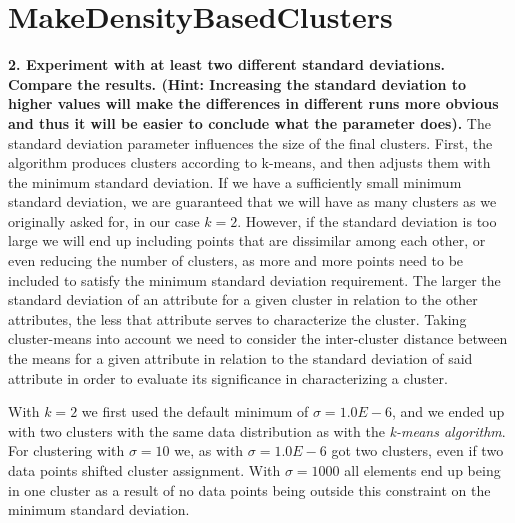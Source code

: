 \documentclass[]{article}
\begin{document}
\section{MakeDensityBasedClusters}
\textbf{2. Experiment with at least two different standard deviations. Compare the results. (Hint: Increasing the standard deviation to higher values will make the differences in different runs more obvious and thus it will be easier to conclude what the parameter does).} 
The standard deviation parameter influences the size of the final clusters. First, the algorithm produces clusters according to k-means, and then adjusts them with the minimum standard deviation. If we have a sufficiently small minimum standard deviation, we are guaranteed that we will have as many clusters as we originally asked for, in our case $k=2$. However, if the standard deviation is too large we will end up including points that are dissimilar among each other, or even reducing the number of clusters, as more and more points need to be included to satisfy the minimum standard deviation requirement. The larger the standard deviation of an attribute for a given cluster in relation to the other attributes, the less that attribute serves to characterize the cluster. Taking cluster-means into account we need to consider the inter-cluster distance between the means for a given attribute in relation to the standard deviation of said attribute in order to evaluate its significance in characterizing a cluster.

With $k=2$ we first used the default minimum of $\sigma=1.0E-6$, and we ended up with two clusters with the same data distribution as with the \textit{k-means algorithm}. For clustering with $\sigma=10$ we, as with $\sigma=1.0E-6$ got two clusters, even if two data points shifted cluster assignment. With $\sigma=1000$ all elements end up being in one cluster as a result of no data points being outside this constraint on the minimum standard deviation.
\end{document}

